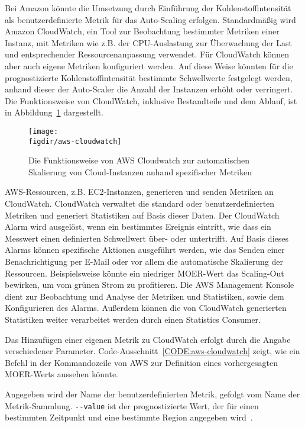 Bei Amazon könnte die Umsetzung durch Einführung der Kohlenstoffintensität als benutzerdefinierte Metrik für das Auto-Scaling erfolgen.
Standardmäßig wird Amazon CloudWatch, ein Tool zur Beobachtung bestimmter Metriken einer Instanz, mit Metriken wie z.B. der CPU-Auslastung zur Überwachung der Last und entsprechender Ressourcenanpassung verwendet.
Für CloudWatch können aber auch eigene Metriken konfiguriert werden.
Auf diese Weise könnten für die prognostizierte Kohlenstoffintensität bestimmte Schwellwerte festgelegt werden, anhand dieser der Auto-Scaler die Anzahl der Instanzen erhöht oder verringert.
Die Funktionsweise von CloudWatch, inklusive Bestandteile und dem Ablauf, ist in Abbildung~\ref{FIG:aws-cloudwatch} dargestellt.
\begin{figure}
 \caption{Die Funktionsweise von AWS Cloudwatch zur automatischen Skalierung von Cloud-Instanzen anhand spezifischer Metriken~\cite{AmazonWebServices.20240320T16:42:17.000Z}}
 {\texttt{[image: \\figdir/aws-cloudwatch]}}
 \label{FIG:aws-cloudwatch}
\end{figure}
AWS-Ressourcen, z.B. EC2-Instanzen, generieren und senden Metriken an CloudWatch.
CloudWatch verwaltet die standard oder benutzerdefinierten Metriken und generiert Statistiken auf Basis dieser Daten.
Der CloudWatch Alarm wird ausgelöst, wenn ein bestimmtes Ereignis eintritt, wie dass ein Messwert einen definierten Schwellwert über- oder untertrifft.
Auf Basis dieses Alarms können spezifische Aktionen ausgeführt werden, wie das Senden einer Benachrichtigung per E-Mail oder vor allem die automatische Skalierung der Ressourcen.
Beispielsweise könnte ein niedriger \ac{MOER}-Wert das Scaling-Out bewirken, um vom grünen Strom zu profitieren.
Die AWS Management Konsole dient zur Beobachtung und Analyse der Metriken und Statistiken, sowie dem Konfigurieren des Alarms.
Außerdem können die von CloudWatch generierten Statistiken weiter verarbeitet werden durch einen Statistics Consumer.

Das Hinzufügen einer eigenen Metrik zu CloudWatch erfolgt durch die Angabe verschiedener Parameter.
Code-Ausschnitt~\ref{CODE:aws-cloudwatch} zeigt, wie ein Befehl in der Kommandozeile von AWS zur Definition eines vorhergesagten \ac{MOER}-Werts aussehen könnte.

Angegeben wird der Name der benutzerdefinierten Metrik, gefolgt vom Name der Metrik-Sammlung.
\lstinline[columns=fixed]{--value} ist der prognostizierte Wert, der für einen bestimmten Zeitpunkt und eine bestimmte Region angegeben wird~\cite{AmazonWebServices.20240320T16:42:17.000Z}.

